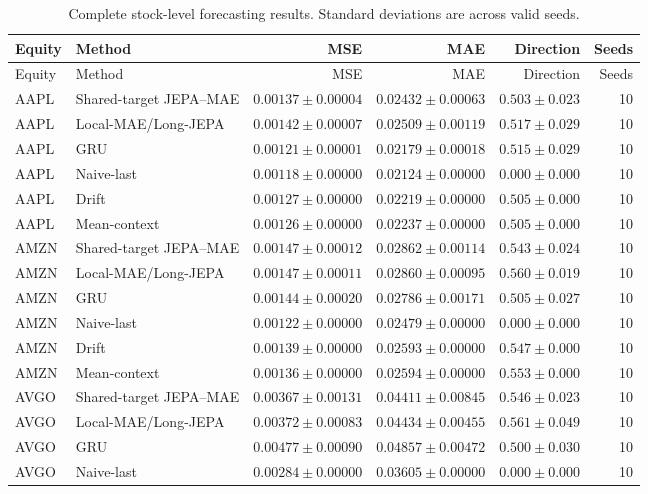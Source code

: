 \begin{longtable}{llrrrr}
\caption{Complete stock-level forecasting results. Standard deviations are across valid seeds.}\label{tab:appendix_stock_metrics}\\
\toprule
Equity & Method & MSE & MAE & Direction & Seeds \\
\midrule
\endfirsthead
\toprule
Equity & Method & MSE & MAE & Direction & Seeds \\
\midrule
\endhead
AAPL & Shared-target JEPA--MAE & $0.00137 \pm 0.00004$ & $0.02432 \pm 0.00063$ & $0.503 \pm 0.023$ & 10 \\
AAPL & Local-MAE/Long-JEPA & $0.00142 \pm 0.00007$ & $0.02509 \pm 0.00119$ & $0.517 \pm 0.029$ & 10 \\
AAPL & GRU & $0.00121 \pm 0.00001$ & $0.02179 \pm 0.00018$ & $0.515 \pm 0.029$ & 10 \\
AAPL & Naive-last & $0.00118 \pm 0.00000$ & $0.02124 \pm 0.00000$ & $0.000 \pm 0.000$ & 10 \\
AAPL & Drift & $0.00127 \pm 0.00000$ & $0.02219 \pm 0.00000$ & $0.505 \pm 0.000$ & 10 \\
AAPL & Mean-context & $0.00126 \pm 0.00000$ & $0.02237 \pm 0.00000$ & $0.505 \pm 0.000$ & 10 \\
AMZN & Shared-target JEPA--MAE & $0.00147 \pm 0.00012$ & $0.02862 \pm 0.00114$ & $0.543 \pm 0.024$ & 10 \\
AMZN & Local-MAE/Long-JEPA & $0.00147 \pm 0.00011$ & $0.02860 \pm 0.00095$ & $0.560 \pm 0.019$ & 10 \\
AMZN & GRU & $0.00144 \pm 0.00020$ & $0.02786 \pm 0.00171$ & $0.505 \pm 0.027$ & 10 \\
AMZN & Naive-last & $0.00122 \pm 0.00000$ & $0.02479 \pm 0.00000$ & $0.000 \pm 0.000$ & 10 \\
AMZN & Drift & $0.00139 \pm 0.00000$ & $0.02593 \pm 0.00000$ & $0.547 \pm 0.000$ & 10 \\
AMZN & Mean-context & $0.00136 \pm 0.00000$ & $0.02594 \pm 0.00000$ & $0.553 \pm 0.000$ & 10 \\
AVGO & Shared-target JEPA--MAE & $0.00367 \pm 0.00131$ & $0.04411 \pm 0.00845$ & $0.546 \pm 0.023$ & 10 \\
AVGO & Local-MAE/Long-JEPA & $0.00372 \pm 0.00083$ & $0.04434 \pm 0.00455$ & $0.561 \pm 0.049$ & 10 \\
AVGO & GRU & $0.00477 \pm 0.00090$ & $0.04857 \pm 0.00472$ & $0.500 \pm 0.030$ & 10 \\
AVGO & Naive-last & $0.00284 \pm 0.00000$ & $0.03605 \pm 0.00000$ & $0.000 \pm 0.000$ & 10 \\

\end{longtable}
